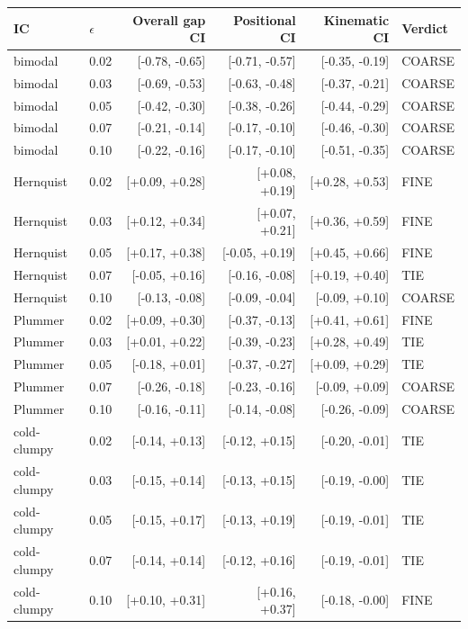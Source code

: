 \begin{tabular}{llrrrl}
\toprule
IC & $\epsilon$ & Overall gap CI & Positional CI & Kinematic CI & Verdict\\
\midrule
bimodal & 0.02 & [-0.78, -0.65] & [-0.71, -0.57] & [-0.35, -0.19] & COARSE\\
bimodal & 0.03 & [-0.69, -0.53] & [-0.63, -0.48] & [-0.37, -0.21] & COARSE\\
bimodal & 0.05 & [-0.42, -0.30] & [-0.38, -0.26] & [-0.44, -0.29] & COARSE\\
bimodal & 0.07 & [-0.21, -0.14] & [-0.17, -0.10] & [-0.46, -0.30] & COARSE\\
bimodal & 0.10 & [-0.22, -0.16] & [-0.17, -0.10] & [-0.51, -0.35] & COARSE\\
\midrule
Hernquist & 0.02 & [+0.09, +0.28] & [+0.08, +0.19] & [+0.28, +0.53] & FINE\\
Hernquist & 0.03 & [+0.12, +0.34] & [+0.07, +0.21] & [+0.36, +0.59] & FINE\\
Hernquist & 0.05 & [+0.17, +0.38] & [-0.05, +0.19] & [+0.45, +0.66] & FINE\\
Hernquist & 0.07 & [-0.05, +0.16] & [-0.16, -0.08] & [+0.19, +0.40] & TIE\\
Hernquist & 0.10 & [-0.13, -0.08] & [-0.09, -0.04] & [-0.09, +0.10] & COARSE\\
\midrule
Plummer & 0.02 & [+0.09, +0.30] & [-0.37, -0.13] & [+0.41, +0.61] & FINE\\
Plummer & 0.03 & [+0.01, +0.22] & [-0.39, -0.23] & [+0.28, +0.49] & TIE\\
Plummer & 0.05 & [-0.18, +0.01] & [-0.37, -0.27] & [+0.09, +0.29] & TIE\\
Plummer & 0.07 & [-0.26, -0.18] & [-0.23, -0.16] & [-0.09, +0.09] & COARSE\\
Plummer & 0.10 & [-0.16, -0.11] & [-0.14, -0.08] & [-0.26, -0.09] & COARSE\\
\midrule
cold-clumpy & 0.02 & [-0.14, +0.13] & [-0.12, +0.15] & [-0.20, -0.01] & TIE\\
cold-clumpy & 0.03 & [-0.15, +0.14] & [-0.13, +0.15] & [-0.19, -0.00] & TIE\\
cold-clumpy & 0.05 & [-0.15, +0.17] & [-0.13, +0.19] & [-0.19, -0.01] & TIE\\
cold-clumpy & 0.07 & [-0.14, +0.14] & [-0.12, +0.16] & [-0.19, -0.01] & TIE\\
cold-clumpy & 0.10 & [+0.10, +0.31] & [+0.16, +0.37] & [-0.18, -0.00] & FINE\\
\bottomrule
\end{tabular}
